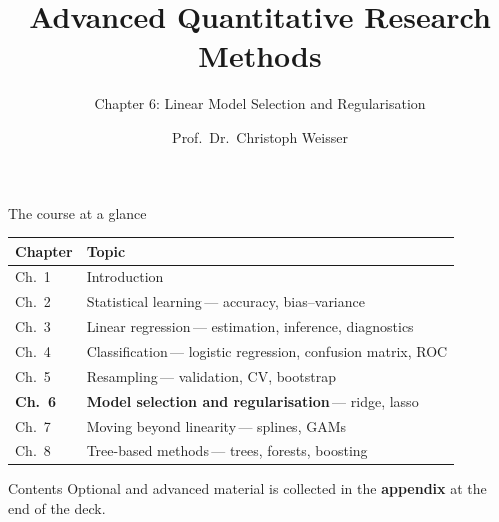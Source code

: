 \documentclass[aspectratio=169,11pt]{beamer}
\title{Advanced Quantitative Research Methods}
\subtitle{Chapter 6: Linear Model Selection and Regularisation}
\author{Prof.\ Dr.\ Christoph Weisser}
\date{}\graphicspath{{images/}}
\begin{document}
\begin{frame}[plain]\titlepage\end{frame}

\begin{frame}{The course at a glance}
  \vspace{-1.5mm}
  \begin{center}
  \scriptsize
  \setlength{\tabcolsep}{5pt}
  \renewcommand{\arraystretch}{1.30}
  \begin{tabular}{@{\hspace{2pt}}l >{\raggedright\arraybackslash}p{}@{\hspace{2pt}}}
    \toprule
    \textbf{Chapter} & \textbf{Topic} \\
    \midrule
     {\color{accent}Ch.\ 1} & Introduction \\
    \rowcolor{black!3} {\color{accent}Ch.\ 2} & Statistical learning\,{\color{black!45}--- accuracy, bias--variance} \\
     {\color{accent}Ch.\ 3} & Linear regression\,{\color{black!45}--- estimation, inference, diagnostics} \\
    \rowcolor{black!3} {\color{accent}Ch.\ 4} & Classification\,{\color{black!45}--- logistic regression, confusion matrix, ROC} \\
     {\color{accent}Ch.\ 5} & Resampling\,{\color{black!45}--- validation, CV, bootstrap} \\
    \rowcolor{accent!18} \textbf{Ch.\ 6} & \textbf{Model selection and regularisation}\,{\color{accent!75!black}--- ridge, lasso} \\
     {\color{accent}Ch.\ 7} & Moving beyond linearity\,{\color{black!45}--- splines, GAMs} \\
    \rowcolor{black!3} {\color{accent}Ch.\ 8} & Tree-based methods\,{\color{black!45}--- trees, forests, boosting} \\
    \bottomrule
  \end{tabular}
  \end{center}
\end{frame}


\begin{frame}{Contents}\small
  \tableofcontents[hideallsubsections]
  \vfill
  {\tiny Optional and advanced material is collected in the \textbf{appendix} at the end of the deck.}
\end{frame}
\end{document}
